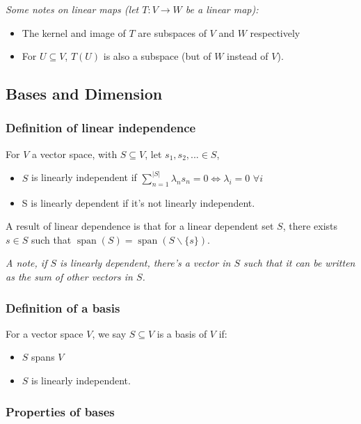 \documentclass[a4paper, 12pt, twoside]{article}
\DeclareMathOperator{\Spa}{span}
\begin{document}
\textit{Some notes on linear maps (let $T: V \to W$ be a linear map):}

\begin{itemize}
  \item The kernel and image of $T$ are subspaces of $V$ and $W$ respectively
  \item For $U \subseteq V$, $T(U)$ is also a subspace (but of $W$ instead of $V$).
\end{itemize}

\subsection{Bases and Dimension}

\subsubsection{Definition of linear independence}

For $V$ a vector space, with $S \subseteq V$, let $s_1, s_2, ... \in S$,

\begin{itemize}
  \item $S$ is linearly independent if $\sum_{n = 1}^{|S|} \lambda_n s_n = 0
          \Longleftrightarrow \lambda_i = 0 \, \, \forall i$
  \item S is linearly dependent if it's not linearly independent.
\end{itemize}

A result of linear dependence is that for a linear dependent set $S$, there
exists $s \in S$ such that $\Spa(S) = \Spa(S\backslash\{s\})$.

\vspace{\baselineskip}

\textit{A note, if $S$ is linearly dependent, there's a vector in $S$ such
  that it can be written as the sum of other vectors in $S$.}

\subsubsection{Definition of a basis}

For a vector space $V$, we say $S \subseteq V$ is a basis of $V$ if:
\begin{itemize}
  \item $S$ spans $V$
  \item $S$ is linearly independent.
\end{itemize}

\subsubsection{Properties of bases}
\end{document}

